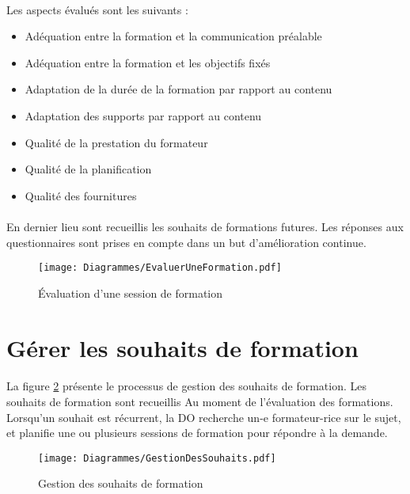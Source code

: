 \paragraph{} Les aspects évalués sont les suivants :
\begin{itemize}
	\item Adéquation entre la formation et la communication préalable
	\item Adéquation entre la formation et les objectifs fixés
	\item Adaptation de la durée de la formation par rapport au contenu
	\item Adaptation des supports par rapport au contenu
	\item Qualité de la prestation du formateur
	\item Qualité de la planification
	\item Qualité des fournitures
\end{itemize}

\paragraph{} En dernier lieu sont recueillis les souhaits de formations futures. Les réponses aux questionnaires sont prises en compte dans un but d'amélioration continue.


\begin{figure}[H]
\centering
	\begin{sideways}
		\texttt{[image: Diagrammes/EvaluerUneFormation.pdf]}
	\end{sideways}
	\caption{Évaluation d'une session de formation}
	\label{evalFormation}
\end{figure}


\section{Gérer les souhaits de formation}
\paragraph{} La figure \ref{souhaits} présente le processus de gestion des souhaits de formation. Les souhaits de formation sont recueillis Au moment de l'évaluation des formations. Lorsqu'un souhait est récurrent, la DO recherche un-e formateur-rice sur le sujet, et planifie une ou plusieurs sessions de formation pour répondre à la demande. 

\begin{figure}[H]
\centering
		\texttt{[image: Diagrammes/GestionDesSouhaits.pdf]}
	\caption{Gestion des souhaits de formation}
	\label{souhaits}
\end{figure}
